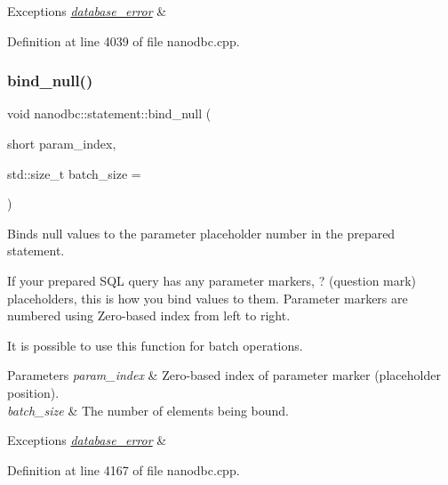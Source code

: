 \begin{DoxyExceptions}{Exceptions}
{\em \mbox{\hyperlink{classnanodbc_1_1database__error}{database\+\_\+error}}} & \\
\hline
\end{DoxyExceptions}


Definition at line 4039 of file nanodbc.\+cpp.

\mbox{\label{group__binding_ga1c92f0059d16d859355f61a020e78d13}} 
\subsubsection{\texorpdfstring{bind\_null()}{bind\_null()}}
{\footnotesize\ttfamily void nanodbc\+::statement\+::bind\+\_\+null (\begin{DoxyParamCaption}\item[{short}]{param\+\_\+index,  }\item[{std\+::size\+\_\+t}]{batch\+\_\+size = {} }\end{DoxyParamCaption})}



Binds null values to the parameter placeholder number in the prepared statement. 

If your prepared S\+QL query has any parameter markers, ? (question mark) placeholders, this is how you bind values to them. Parameter markers are numbered using Zero-\/based index from left to right.

It is possible to use this function for batch operations.


\begin{DoxyParams}{Parameters}
{\em param\+\_\+index} & Zero-\/based index of parameter marker (placeholder position). \\
\hline
{\em batch\+\_\+size} & The number of elements being bound. \\
\hline
\end{DoxyParams}

\begin{DoxyExceptions}{Exceptions}
{\em \mbox{\hyperlink{classnanodbc_1_1database__error}{database\+\_\+error}}} & \\
\hline
\end{DoxyExceptions}


Definition at line 4167 of file nanodbc.\+cpp.

